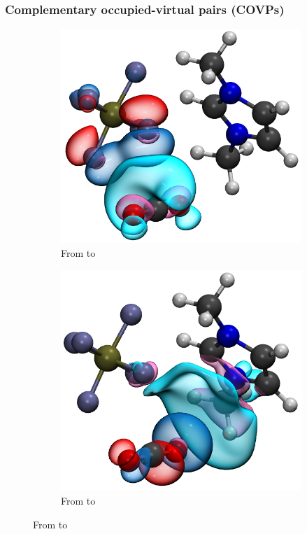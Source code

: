 \documentclass{beamer}
\begin{document}
\begin{frame}
  \frametitle{Complementary occupied-virtual pairs (COVPs)}
  \centering
  \begin{figure}
    \begin{subfigure}[b]{0.50\linewidth}
      \includegraphics[width=\linewidth,keepaspectratio,natwidth=601,natheight=535]{./figures/PF6.to_CO2.1.png}
      \caption*{From \ce{[PF6]-} to }
    \end{subfigure}%
    \begin{subfigure}[b]{0.50\linewidth}
      \includegraphics[width=\linewidth,keepaspectratio,natwidth=586,natheight=538]{./figures/PF6.from_CO2.1.png}
      \caption*{From  to \ce{[C1C1im]+}}
    \end{subfigure}
  \end{figure}
\end{frame}
\end{document}
